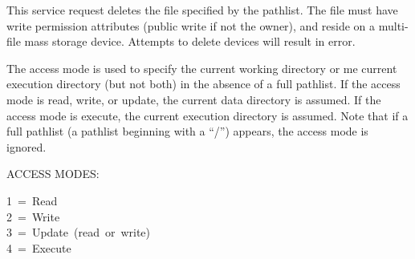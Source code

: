 \documentclass[
]{article}
\begin{document}
This service request deletes the file specified by the pathlist. The
file must have write permission attributes (public write if not the
owner), and reside on a multi-file mass storage device. Attempts to
delete devices will result in error.

The access mode is used to specify the current working directory or me
current execution directory (but not both) in the absence of a full
pathlist. If the access mode is read, write, or update, the current data
directory is assumed. If the access mode is execute, the current
execution directory is assumed. Note that if a full pathlist (a pathlist
beginning with a ``/'') appears, the access mode is ignored.

ACCESS MODES:

1~=~Read\\
2~=~Write\\
3~=~Update~(read~or~write)\\
4~=~Execute\\
\end{document}
